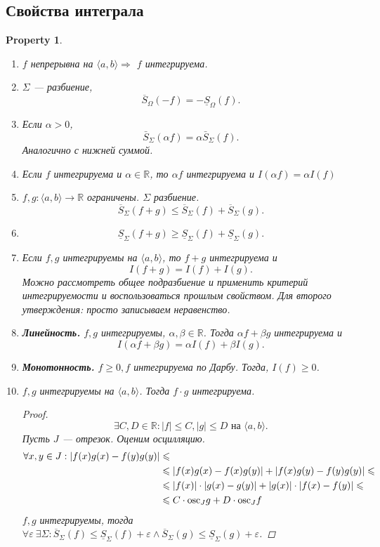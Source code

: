 \documentclass[11pt]{book}
\newcommand{\R}{\mathbb{R}}
\newcommand{\osc}{{\mathop{\text{\rm osc}}}}
\renewcommand{\le}{\leqslant}
\renewcommand{\ge}{\geqslant}
\theoremstyle{definition}
\theoremstyle{plain}
\theoremstyle{plain}
\newtheorem*{prop}{Property}
\theoremstyle{definition}
\theoremstyle{remark}
\begin{document}
\subsection{Свойства интеграла}
\begin{prop}
    $ $
    \begin{enumerate}
	\item $ f$   непрерывна на $ \langle a, b \rangle \Rightarrow $ $ f$   интегрируема.
	\item  $ \Sigma  $ --- разбиение, \[
		\overline{S}_{ \Omega } (-f) =  -\underline{S}_{ \Omega } (f)
	    .\]
	\item Если $ \alpha >0$, \[
		\bar{S}_{ \Sigma }(\alpha f) = \alpha \bar{S}_{ \Sigma}(f)
	    .\]
	    Аналогично с нижней суммой.
	\item Если $ f$   интегрируема и $ \alpha  \in  \R$, то $ \alpha  f$   интегрируема и $ I( \alpha  f) = \alpha I(f)$
	\item $ f, g : \langle a, b \rangle \to  \R$   ограничены. $ \Sigma $   разбиение.
	    \[
		\overline{S}_{ \Sigma }(f+g) \le  \overline{S}_{ \Sigma }(f) + \overline{S}_{ \Sigma } (g)
	    .\]
	\item
	    \[
		\underline{S}_{ \Sigma } (f + g)  \ge  \underline{S}_{ \Sigma } (f) + \underline{S}_{ \Sigma }(g)
	    .\]
	\item  Если $ f , g$   интегрируемы на $ \langle a, b \rangle$, то $ f + g $   интегрируема и \[
		I(f+g) = I(f) + I(g)
	    .\]
	    Можно рассмотреть общее подразбиение и применить критерий интегрируемости и воспользоваться прошлым свойством. Для второго утверждения: просто записываем неравенство.
	\item {\bf Линейность.} $ f, g$   интегрируемы, $ \alpha , \beta \in  \R$.
	    Тогда $ \alpha f + \beta  g$  интегрируема и
	    \[
		I( \alpha f+ \beta g) = \alpha I(f) + \beta  I(g)
	    .\]
	\item {\bf Монотонность.}
	    $ f \ge 0, f$   интегрируема по Дарбу. Тогда, $ I(f) \ge  0$.
	\item $ f, g$   интегрируемы на $ \langle a, b \rangle$. Тогда $ f \cdot g$   интегрируема.
	    \begin{proof}
		\[
		    \exists  C, D \in  \R: |f| \le  C, |g| \le D \text{ на } \langle a, b \rangle
		.\]
		Пусть $ J$ --- отрезок. Оценим осцилляцию.
		\[
		    \begin{aligned}
			\forall  x, y \in  J: | f(x) g(x) - f(y) g(y)| &\le \\ 
			&\le  |f(x) g(x) - f(x) g(y)| + |f(x) g(y) - f(y) g(y)| \le  \\
									       & \le   |f(x)| \cdot |g(x) - g(y)| + |g(x) | \cdot |f(x) - f(y)| \le \\
										    &\le  C \cdot \osc_J g + D \cdot \osc_J f
		    \end{aligned}
		\]
		$ f, g$   интегрируемы, тогда $ \forall  \varepsilon  ~ \exists  \Sigma  : \overline{S}_{ \Sigma } (f) \le  \underline{S} _{ \Sigma } (f) + \varepsilon  \wedge \overline{S}_{ \Sigma}(g) \le \underline{S}_{ \Sigma }(g)  + \varepsilon $.


\end{proof}
\end{enumerate}
\end{prop}
\end{document}
